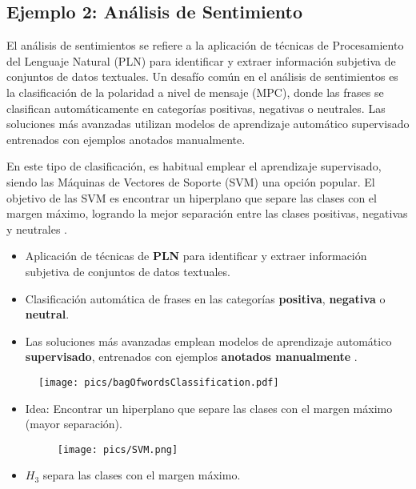 \subsection{Ejemplo 2: Análisis de Sentimiento}

El análisis de sentimientos se refiere a la aplicación de técnicas de Procesamiento del Lenguaje Natural (PLN) para identificar y extraer información subjetiva de conjuntos de datos textuales. Un desafío común en el análisis de sentimientos es la clasificación de la polaridad a nivel de mensaje (MPC), donde las frases se clasifican automáticamente en categorías positivas, negativas o neutrales. Las soluciones más avanzadas utilizan modelos de aprendizaje automático supervisado entrenados con ejemplos anotados manualmente.

En este tipo de clasificación, es habitual emplear el aprendizaje supervisado, siendo las Máquinas de Vectores de Soporte (SVM) una opción popular. El objetivo de las SVM es encontrar un hiperplano que separe las clases con el margen máximo, logrando la mejor separación entre las clases positivas, negativas y neutrales \cite{jacobbook}.

\begin{itemize}
  \item Aplicación de técnicas de \textbf{PLN} para identificar y extraer información subjetiva de conjuntos de datos textuales.
  \item Clasificación automática de frases en las categorías \textcolor[rgb]{0.00,0.00,1.00}{\textbf{positiva}}, \textcolor[rgb]{1.00,0.00,0.00}{\textbf{negativa}} o \textcolor[rgb]{0.00,1.00,0.00}{\textbf{neutral}}.

  \item Las soluciones más avanzadas emplean modelos de aprendizaje automático \textbf{supervisado}, entrenados con ejemplos \textbf{anotados manualmente} \cite{Mohammad2013}.
\end{itemize}


\begin{figure}[h]
        	\texttt{[image: pics/bagOfwordsClassification.pdf]}
        \end{figure}


\begin{itemize}


\item Idea: Encontrar un hiperplano que separe las clases con el margen máximo (mayor separación).

     \begin{figure}[h]
        	\texttt{[image: pics/SVM.png]}
        \end{figure}

\item $H_3$ separa las clases con el margen máximo.

\end{itemize}


